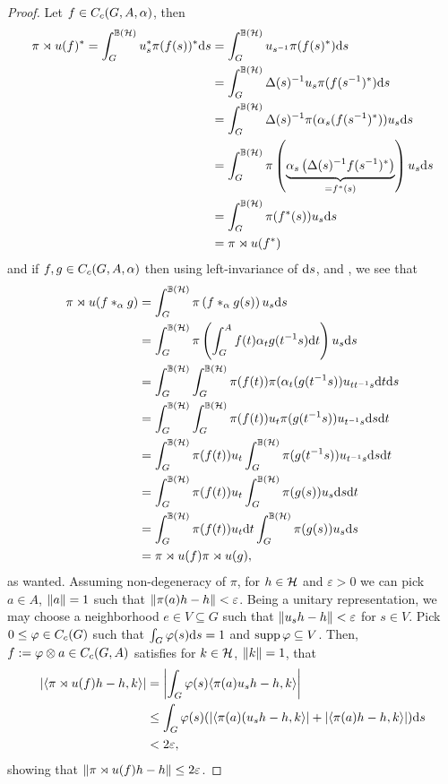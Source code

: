 \begin{proof}
	Let $f \in C_c(G,A,\alpha)$, then
	\begin{align*}
		\pi \rtimes u(f)^* = \int_G^{\mathbb{B}(\mathcal{H})}  u_s^* \pi(f(s))^* \mathrm{d} s &= \int_G^{\mathbb{B}(\mathcal{H})} u_{s^{-1}} \pi(f(s)^*) \mathrm{d} s\\
		&= \int_G^{\mathbb{B}(\mathcal{H})} \Delta(s)^{-1} u_{s} \pi(f(s^{-1})^*) \mathrm{d} s \\
		&= \int_G^{\mathbb{B}(\mathcal{H})} \Delta(s)^{-1} \pi(\alpha_s(f(s^{-1})^*)) u_s \mathrm{d} s\\
		&= \int_G^{\mathbb{B}(\mathcal{H})} \pi\left( \underbrace{\alpha_s\left( \Delta(s)^{-1}f(s^{-1})^* \right)}_{=f^*(s)} \right) u_s \mathrm{d} s\\
		&= \int_G^{\mathbb{B}(\mathcal{H})} \pi(f^*(s)) u_s \mathrm{d} s\\
		&= \pi \rtimes u(f^*)
	\end{align*}
	and if $f,g \in C_c(G,A,\alpha)$ then using left-invariance of $\mathrm{d} s$,  and , we see that
	\begin{align*}
		\pi \rtimes u(f\ast_{\alpha}g) &= \int_G^{\mathbb{B}(\mathcal{H})} \pi \left( f \ast_\alpha g(s) \right)u_s \mathrm{d} s\\
		&= \int_G^{\mathbb{B}(\mathcal{H})} \pi\left( \int_G^A f(t) \alpha_t g(t^{-1}s) \mathrm{d} t \right)u_s \mathrm{d} s\\
		&= \int_G^{\mathbb{B}(\mathcal{H})}\int_G^{\mathbb{B}(\mathcal{H})} \pi(f(t)) \pi(\alpha_t(g(t^{-1}s))u_{t t^{-1}s} \mathrm{d} t \mathrm{d} s\\
		&= \int_G^{\mathbb{B}(\mathcal{H})} \int_G ^{\mathbb{B}(\mathcal{H})} \pi(f(t)) u_t \pi(g(t^{-1}s)) u_{t^{-1}s}\mathrm{d} s \mathrm{d} t\\
		&= \int_G^{\mathbb{B}(\mathcal{H})} \pi(f(t)) u_t \int_G^{\mathbb{B}(\mathcal{H})} \pi(g(t^{-1}s )) u_{t^{-1}s} \mathrm{d} s \mathrm{d} t\\
		&= \int_G ^{\mathbb{B}(\mathcal{H})} \pi(f(t)) u_t \int_G ^{\mathbb{B}(\mathcal{H})} \pi(g(s)) u_s \mathrm{d} s \mathrm{d} t\\
		&= \int_G ^{\mathbb{B}(\mathcal{H})} \pi(f(t)) u_t \mathrm{d} t \int_G ^{\mathbb{B}(\mathcal{H})} \pi(g(s)) u_s \mathrm{d} s \\
		&= \pi \rtimes u (f) \pi\rtimes u (g),
	\end{align*}
	as wanted. Assuming non-degeneracy of $\pi$, for $h \in \mathcal{H}$ and $\varepsilon>0$ we can pick $a \in A$, $\left\lVert a \right\rVert =1$ such that $\left\lVert \pi(a) h - h \right\rVert < \varepsilon$. Being a unitary representation, we may choose a neighborhood $e \in V \subseteq G$ such that $\left\lVert u_s h - h\right\rVert < \varepsilon$ for $s \in V$. Pick $0 \leq \varphi \in C_c(G)$ such that $\int_G \varphi(s) \mathrm{d} s = 1$ and $\operatorname{supp} \varphi \subseteq V$. Then, $f := \varphi \otimes a \in C_c(G,A)$ satisfies for $k \in \mathcal{H}$, $\left\lVert k \right\rVert = 1$, that
	\begin{align*}
	\left| \langle \pi \rtimes u(f)h-h,k\rangle \right| &= 	\left| \int_G \varphi(s) \langle \pi(a)u_s h-h,k \rangle\right|\\
	& \leq \int_G \varphi(s) (|\langle \pi(a) (u_s h-h,k\rangle|+|\langle \pi(a)h-h,k\rangle| ) \mathrm{d} s \\
	&< 2 \varepsilon,
	\end{align*}
	showing that $\left\lVert \pi \rtimes u(f)h-h\right\rVert \leq 2 \varepsilon$.
\end{proof}

